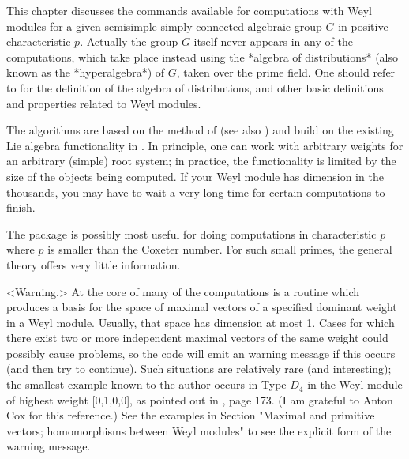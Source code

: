 


This chapter discusses the commands available for computations with
Weyl modules for a given semisimple simply-connected algebraic group
$G$ in positive characteristic $p$. Actually the group $G$ itself
never appears in any of the computations, which take place instead
using the *algebra of distributions* (also known as the
*hyperalgebra*) of $G$, taken over the prime field.  One should refer
to \cite{Jantzen} for the definition of the algebra of distributions,
and other basic definitions and properties related to Weyl modules.

The algorithms are based on the method of \cite{Irving} (see also
\cite{Xi}) and build on the existing Lie algebra functionality in
\GAP. In principle, one can work with arbitrary weights for an
arbitrary (simple) root system; in practice, the functionality is
limited by the size of the objects being computed. If your Weyl module
has dimension in the thousands, you may have to wait a very long time
for certain computations to finish.

The package is possibly most useful for doing computations in
characteristic $p$ where $p$ is smaller than the Coxeter number. For
such small primes, the general theory offers very little information. 

<Warning.> At the core of many of the computations is a routine which
produces a basis for the space of maximal vectors of a specified
dominant weight in a Weyl module. Usually, that space has dimension at
most 1.  Cases for which there exist two or more independent maximal
vectors of the same weight could possibly cause problems, so the code
will emit an warning message if this occurs (and then try to
continue).  Such situations are relatively rare (and interesting); the
smallest example known to the author occurs in Type $D_4$ in the Weyl
module of highest weight [0,1,0,0], as pointed out in \cite{CPS}, page
173. (I am grateful to Anton Cox for this reference.) See the examples
in Section "Maximal and primitive vectors; homomorphisms between Weyl
modules" to see the explicit form of the warning message.



